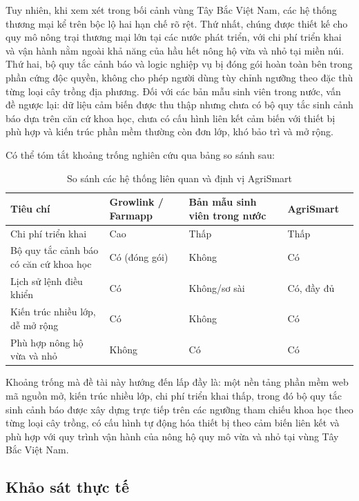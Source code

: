 \documentclass[13pt,a4paper]{extarticle}
\numberwithin{figure}{section}
\numberwithin{table}{section}
\begin{document}
	Tuy nhiên, khi xem xét trong bối cảnh vùng Tây Bắc Việt Nam, các hệ thống thương mại kể trên bộc lộ hai hạn chế rõ rệt. Thứ nhất, chúng được thiết kế cho quy mô nông trại thương mại lớn tại các nước phát triển, với chi phí triển khai và vận hành nằm ngoài khả năng của hầu hết nông hộ vừa và nhỏ tại miền núi. Thứ hai, bộ quy tắc cảnh báo và logic nghiệp vụ bị đóng gói hoàn toàn bên trong phần cứng độc quyền, không cho phép người dùng tùy chỉnh ngưỡng theo đặc thù từng loại cây trồng địa phương. Đối với các bản mẫu sinh viên trong nước, vấn đề ngược lại: dữ liệu cảm biến được thu thập nhưng chưa có bộ quy tắc sinh cảnh báo dựa trên căn cứ khoa học, chưa có cấu hình liên kết cảm biến với thiết bị phù hợp và kiến trúc phần mềm thường còn đơn lớp, khó bảo trì và mở rộng.
	
	Có thể tóm tắt khoảng trống nghiên cứu qua bảng so sánh sau:
	
	\begin{table}[H]
		\centering
		\caption{So sánh các hệ thống liên quan và định vị AgriSmart}
		\label{tab:related-systems}
		\begin{tabular}{|p{3.5cm}|p{2.5cm}|p{2.5cm}|p{2.5cm}|p{2.5cm}|}
			\hline
			\textbf{Tiêu chí} & \textbf{Growlink / Farmapp} & \textbf{Bản mẫu sinh viên trong nước} & \textbf{AgriSmart} \\
			\hline
			Chi phí triển khai & Cao & Thấp & Thấp \\
			\hline
			Bộ quy tắc cảnh báo có căn cứ khoa học & Có (đóng gói) & Không & Có \\
			\hline
			Lịch sử lệnh điều khiển & Có & Không/sơ sài & Có, đầy đủ \\
			\hline
			Kiến trúc nhiều lớp, dễ mở rộng & Có & Không & Có \\
			\hline
			Phù hợp nông hộ vừa và nhỏ & Không & Có & Có \\
			\hline
		\end{tabular}
	\end{table}
	
	Khoảng trống mà đề tài này hướng đến lấp đầy là: một nền tảng phần mềm web mã nguồn mở, kiến trúc nhiều lớp, chi phí triển khai thấp, trong đó bộ quy tắc sinh cảnh báo được xây dựng trực tiếp trên các ngưỡng tham chiếu khoa học theo từng loại cây trồng, có cấu hình tự động hóa thiết bị theo cảm biến liên kết và phù hợp với quy trình vận hành của nông hộ quy mô vừa và nhỏ tại vùng Tây Bắc Việt Nam.
	
	\subsection{Khảo sát thực tế}
	
\end{document}
